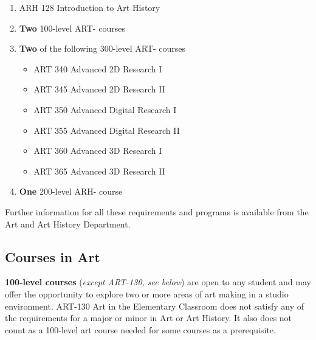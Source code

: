 \documentclass[
  letterpaper,
]{scrbook}
\providecommand{\tightlist}{%
  \setlength{\itemsep}{0pt}\setlength{\parskip}{0pt}}
\begin{document}
\begin{enumerate}
\def\labelenumi{\arabic{enumi}.}
\item
  ARH 128 Introduction to Art History\\
\item
  \textbf{Two} 100-level ART- courses\\
\item
  \textbf{Two} of the following 300-level ART- courses

  \begin{itemize}
  \tightlist
  \item
    ART 340 Advanced 2D Research I\\
  \item
    ART 345 Advanced 2D Research II\\
  \item
    ART 350 Advanced Digital Research I\\
  \item
    ART 355 Advanced Digital Research II\\
  \item
    ART 360 Advanced 3D Research I\\
  \item
    ART 365 Advanced 3D Research II\\
  \end{itemize}
\item
  \textbf{One} 200-level ARH- course
\end{enumerate}

Further information for all these requirements and programs is available
from the Art and Art History Department.

\subsection{Courses in Art}\label{courses-in-art}

\textbf{100-level courses} (\emph{except ART-130, see below}) are open
to any student and may offer the opportunity to explore two or more
areas of art making in a studio environment. ART-130 Art in the
Elementary Classroom does not satisfy any of the requirements for a
major or minor in Art or Art History. It also does not count as a
100-level art course needed for some courses as a prerequisite.
\end{document}
